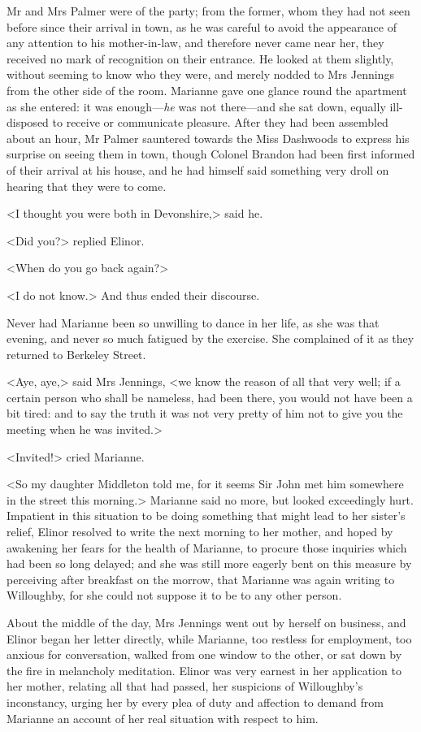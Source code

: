 Mr and Mrs Palmer were of the party; from the former, whom they had not seen before since their arrival in town, as he was careful to avoid the appearance of any attention to his mother-in-law, and therefore never came near her, they received no mark of recognition on their entrance. He looked at them slightly, without seeming to know who they were, and merely nodded to Mrs Jennings from the other side of the room. Marianne gave one glance round the apartment as she entered: it was enough—\textit{he} was not there—and she sat down, equally ill-disposed to receive or communicate pleasure. After they had been assembled about an hour, Mr Palmer sauntered towards the Miss Dashwoods to express his surprise on seeing them in town, though Colonel Brandon had been first informed of their arrival at his house, and he had himself said something very droll on hearing that they were to come.

<I thought you were both in Devonshire,> said he.

<Did you?> replied Elinor.

<When do you go back again?>

<I do not know.> And thus ended their discourse.

Never had Marianne been so unwilling to dance in her life, as she was that evening, and never so much fatigued by the exercise. She complained of it as they returned to Berkeley Street.

<Aye, aye,> said Mrs Jennings, <we know the reason of all that very well; if a certain person who shall be nameless, had been there, you would not have been a bit tired: and to say the truth it was not very pretty of him not to give you the meeting when he was invited.>

<Invited!> cried Marianne.

<So my daughter Middleton told me, for it seems Sir John met him somewhere in the street this morning.> Marianne said no more, but looked exceedingly hurt. Impatient in this situation to be doing something that might lead to her sister's relief, Elinor resolved to write the next morning to her mother, and hoped by awakening her fears for the health of Marianne, to procure those inquiries which had been so long delayed; and she was still more eagerly bent on this measure by perceiving after breakfast on the morrow, that Marianne was again writing to Willoughby, for she could not suppose it to be to any other person.

About the middle of the day, Mrs Jennings went out by herself on business, and Elinor began her letter directly, while Marianne, too restless for employment, too anxious for conversation, walked from one window to the other, or sat down by the fire in melancholy meditation. Elinor was very earnest in her application to her mother, relating all that had passed, her suspicions of Willoughby's inconstancy, urging her by every plea of duty and affection to demand from Marianne an account of her real situation with respect to him.

